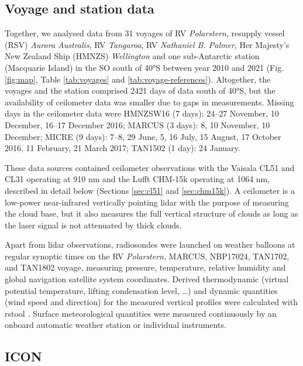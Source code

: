 \documentclass[12pt,a4paper]{article}
\begin{document}
\subsection{Voyage and station data}

Together, we analysed data from 31 voyages of RV \emph{Polarstern}, resupply
vessel (RSV) \emph{Aurora Australis}, RV \emph{Tangaroa}, RV \emph{Nathaniel B.
Palmer}, Her Majesty's New Zealand Ship (HMNZS) \emph{Wellington} and one
sub-Antarctic station (Macquarie Island) in the SO south of 40°S between year
2010 and 2021 (Fig. \ref{fig:map}, Table \ref{tab:voyages} and
\ref{tab:voyage-references}). Altogether, the voyages and the station comprised
2421 days of data south of 40°S, but the availability of ceilometer data was
smaller due to gaps in measurements. Missing days in the ceilometer data were
HMNZSW16 (7 days): 24--27 November, 10 December, 16--17 December 2016; MARCUS
(3 days): 8, 10 November, 10 December; MICRE (9 days): 7--8, 29 June, 5, 16
July, 15 August, 17 October 2016, 11 February, 21 March 2017; TAN1502 (1 day):
24 January.

These data sources contained ceilometer observations with the Vaisala CL51 and
CL31 operating at 910 nm and the Lufft CHM-15k operating at 1064 nm, described
in detail below (Sections \ref{sec:cl51} and \ref{sec:chm15k}). A ceilometer is
a low-power near-infrared vertically pointing lidar with the purpose of
measuring the cloud base, but it also measures the full vertical structure of
clouds as long as the laser signal is not attenuated by thick clouds.

Apart from lidar observations, radiosondes were launched on weather balloons at
regular synoptic times on the RV \emph{Polarstern}, MARCUS, NBP17024, TAN1702,
and TAN1802 voyage, measuring pressure, temperature, relative humidity and
global navigation satellite system coordinates. Derived thermodynamic (virtual
potential temperature, lifting condensation level, \ldots) and dynamic
quantities (wind speed and direction) for the measured vertical profiles were
calculated with rstool \citep{rstool}. Surface meteorological quantities were
measured continuously by an onboard automatic weather station or individual
instruments.

\subsection{ICON}
\end{document}
